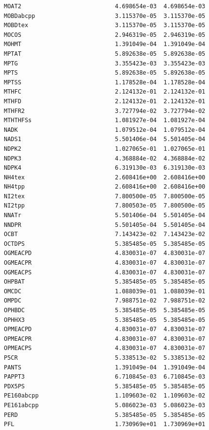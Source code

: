 \documentclass{scrartcl}
\begin{document}
\begin{enumerate}
\begin{lstlisting}
MOAT2                           4.698654e-03  4.698654e-03
MOBDabcpp                       3.115370e-05  3.115370e-05
MOBDtex                         3.115370e-05  3.115370e-05
MOCOS                           2.946319e-05  2.946319e-05
MOHMT                           1.391049e-04  1.391049e-04
MPTAT                           5.892638e-05  5.892638e-05
MPTG                            3.355423e-03  3.355423e-03
MPTS                            5.892638e-05  5.892638e-05
MPTSS                           1.178528e-04  1.178528e-04
MTHFC                           2.124132e-01  2.124132e-01
MTHFD                           2.124132e-01  2.124132e-01
MTHFR2                          3.727794e-02  3.727794e-02
MTHTHFSs                        1.081927e-04  1.081927e-04
NADK                            1.079512e-04  1.079512e-04
NADS1                           5.501406e-04  5.501405e-04
NDPK2                           1.027065e-01  1.027065e-01
NDPK3                           4.368884e-02  4.368884e-02
NDPK4                           6.319130e-03  6.319130e-03
NH4tex                          2.608416e+00  2.608416e+00
NH4tpp                          2.608416e+00  2.608416e+00
NI2tex                          7.800500e-05  7.800500e-05
NI2tpp                          7.800503e-05  7.800500e-05
NNATr                           5.501406e-04  5.501405e-04
NNDPR                           5.501405e-04  5.501405e-04
OCBT                            7.143423e-02  7.143423e-02
OCTDPS                          5.385485e-05  5.385485e-05
OGMEACPD                        4.830031e-07  4.830031e-07
OGMEACPR                        4.830031e-07  4.830031e-07
OGMEACPS                        4.830031e-07  4.830031e-07
OHPBAT                          5.385485e-05  5.385485e-05
OMCDC                           1.088039e-01  1.088039e-01
OMPDC                           7.988751e-02  7.988751e-02
OPHBDC                          5.385485e-05  5.385485e-05
OPHHX3                          5.385485e-05  5.385485e-05
OPMEACPD                        4.830031e-07  4.830031e-07
OPMEACPR                        4.830031e-07  4.830031e-07
OPMEACPS                        4.830031e-07  4.830031e-07
P5CR                            5.338513e-02  5.338513e-02
PANTS                           1.391049e-04  1.391049e-04
PAPPT3                          6.710845e-03  6.710845e-03
PDX5PS                          5.385485e-05  5.385485e-05
PE160abcpp                      1.109603e-02  1.109603e-02
PE161abcpp                      5.086023e-03  5.086023e-03
PERD                            5.385485e-05  5.385485e-05
PFL                             1.730969e+01  1.730969e+01

\end{lstlisting}
\end{enumerate}
\end{document}
